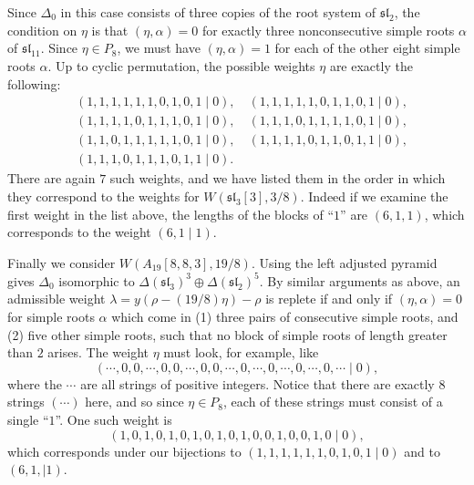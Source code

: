 \documentclass[12pt]{amsart}
\theoremstyle{plain}
\theoremstyle{definition}
\numberwithin{equation}{section}
\newcommand{\al}{\alpha}
\newcommand{\la}{\lambda}
\newcommand{\D}{\Delta}
\newcommand{\sll}{\mathfrak{sl}}
\begin{document}
Since $\D_0$ in this case consists of three copies of the root system of $\sll_2$, the condition on $\eta$ is that $(\eta, \al) = 0$ for exactly three nonconsecutive simple roots $\al$ of $\widehat{\sll}_{11}$. Since $\eta \in P_8$, we must have $(\eta, \al) = 1$ for each of the other eight simple roots $\al$. Up to cyclic permutation, the possible weights $\eta$ are exactly the following:
\begin{align*}
&(1, 1, 1, 1, 1, 1, 0, 1, 0, 1 \mid 0), \quad
(1, 1, 1, 1, 1, 0, 1, 1, 0, 1 \mid 0), \\
&(1, 1, 1, 1, 0, 1, 1, 1, 0, 1 \mid 0), \quad
(1, 1, 1, 0, 1, 1, 1, 1, 0, 1 \mid 0), \\
&(1, 1, 0, 1, 1, 1, 1, 1, 0, 1 \mid 0), \quad
(1, 1, 1, 1, 0, 1, 1, 0, 1, 1 \mid 0), \\
&(1, 1, 1, 0, 1, 1, 1, 0, 1, 1 \mid 0).
\end{align*}
There are again $7$ such weights, and we have listed them in the order in which they correspond to the weights for $W(\sll_3[3], 3/8)$. Indeed if we examine the first weight in the list above, the lengths of the blocks of ``$1$'' are $(6, 1, 1)$, which corresponds to the weight $(6, 1 \mid 1)$.%

Finally we consider $W(A_{19}[8, 8, 3], 19/8)$. Using the left adjusted pyramid gives $\D_0$ isomorphic to $\D(\sll_3)^3 \oplus \D(\sll_2)^5$. By similar arguments as above, an admissible weight $\la = y(\rho - (19/8)\eta) - \rho$ is replete if and only if $(\eta, \al) = 0$ for simple roots $\al$ which come in (1) three pairs of consecutive simple roots, and (2) five other simple roots, such that no block of simple roots of length greater than $2$ arises. The weight $\eta$ must look, for example, like
\[
(\cdots, 0, 0, \cdots, 0, 0, \cdots, 0, 0, \cdots, 0, \cdots, 0, \cdots, 0, \cdots, 0, \cdots \mid 0),
\]
where the $\cdots$ are all strings of positive integers. Notice that there are exactly $8$ strings $(\cdots)$ here, and so since $\eta \in P_8$, each of these strings must consist of a single ``$1$''. One such weight is
\[
(1, 0, 1, 0, 1, 0, 1, 0, 1, 0, 1, 0, 0, 1, 0, 0, 1, 0 \mid 0),
\]
which corresponds under our bijections to $(1, 1, 1, 1, 1, 1, 0, 1, 0, 1 \mid 0)$ and to $(6, 1, \mid 1)$.

\end{document}
